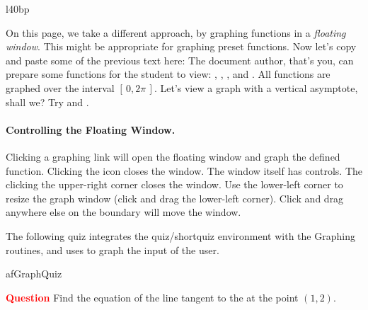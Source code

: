 \documentclass{article}
\begin{document}
\begin{wrapfigure}[3]{l}{40bp}%
\vspace{-\baselineskip}
\iconFloatGraphScreen[poster=aflogo]{40bp}{!}
\end{wrapfigure}%
On this page, we take a different approach, by graphing functions
in a \textsl{floating window}. This might be appropriate for graphing
preset functions. Now let's copy and paste some of the previous text
here: The document author, that's you, can prepare some functions
for the student to view:
,
,
, and
.
All functions are graphed over the interval
$[\,0, 2\pi\,]$. Let's view a graph with a vertical asymptote, shall we?
Try 
and .


\makebox[\linewidth][c]{\rule{.67\linewidth}{.4pt}}

\parskip6pt

\paragraph*{Controlling the Floating Window.} Clicking a graphing
link will open the floating window and graph the defined function.
Clicking the {\AcroFLeX} icon closes the window. The window itself
has controls. The clicking the upper-right corner closes the window.
Use the lower-left corner to resize the graph window (click and drag
the lower-left corner). Click and drag anywhere else on the boundary
will move the window.

\makebox[\linewidth][c]{\rule{.67\linewidth}{.4pt}}

The following quiz integrates the quiz/shortquiz environment with
the {\AcroFLeX} Graphing routines, and uses \texttt{\string{}}
to graph the input of the user.

\begin{oQuestion}{afGraphQuiz}


\textbf{\textcolor{red}{Question}} Find the equation of the line
tangent to the  at the
    {point $ (1,2) $}. \hfill{}\sqClearButton

\end{oQuestion}
\end{document}
